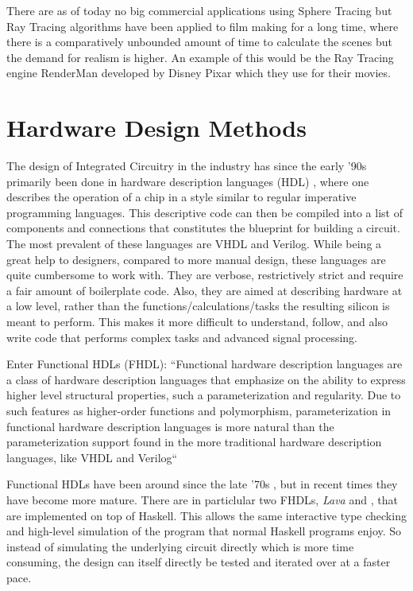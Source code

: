 There are as of today no big commercial applications using Sphere Tracing but
Ray Tracing algorithms have been applied to film making for a long time, where
there is a comparatively unbounded amount of time to calculate the scenes but
the demand for realism is higher. An example of this would be the Ray Tracing
engine RenderMan developed by Disney Pixar which they use for their
movies.\cite{TODO}

\section{ Hardware Design Methods } 

The design of Integrated Circuitry in the industry has since the early '90s 
primarily been done in hardware description languages (HDL) \cite{Chen2012}, 
where one describes the operation of a chip in a style similar to regular 
imperative programming languages. This descriptive code can then be compiled 
into a list of components and connections that constitutes the blueprint for 
building a circuit. The most prevalent of these languages are VHDL and 
Verilog. While being a great help to designers, compared to more manual 
design, these languages are quite cumbersome to work with. They are verbose, 
restrictively strict and require a fair amount of boilerplate code. Also, 
they are aimed at describing hardware at a low level, rather than the 
functions/calculations/tasks the resulting silicon is meant to perform. This 
makes it more difficult to understand, follow, and also write code that 
performs complex tasks and advanced signal processing.

Enter Functional HDLs (FHDL): ``Functional hardware description languages are a
class of hardware description languages that emphasize on the ability to
express higher level structural properties, such a parameterization and
regularity. Due to such features as higher-order functions and polymorphism,
parameterization in functional hardware description languages is more natural
than the parameterization support found in the more traditional hardware
description languages, like VHDL and Verilog`` \cite{Baaij2009}

Functional HDLs have been around since the late '70s \cite{Chen2012}, but in
recent times they have become more mature. There are in particlular two FHDLs,
\emph{Lava} and \clash \cite{Baaij2009,Bjesse1998}, that are implemented
on top of Haskell. This allows the same interactive type checking and
high-level simulation of the program that normal Haskell programs enjoy. So
instead of simulating the underlying circuit directly which is more time
consuming, the design can itself directly be tested and iterated over at a
faster pace.
